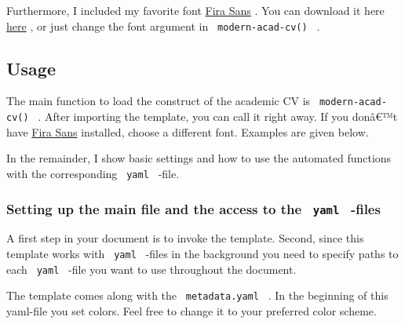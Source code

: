 Furthermore, I included my favorite font
\href{https://fonts.google.com/specimen/Fira+Sans}{Fira Sans} . You can
download it here
\href{https://fonts.google.com/specimen/Fira+Sans}{here} , or just
change the font argument in \texttt{\ modern-acad-cv()\ } .

\subsection{Usage}\label{usage}

The main function to load the construct of the academic CV is
\texttt{\ modern-acad-cv()\ } . After importing the template, you can
call it right away. If you donâ€™t have
\href{https://fonts.google.com/specimen/Fira+Sans}{Fira Sans} installed,
choose a different font. Examples are given below.

\begin{Shaded}
\begin{Highlighting}[]

\NormalTok{)    }

\end{Highlighting}
\end{Shaded}

In the remainder, I show basic settings and how to use the automated
functions with the corresponding \texttt{\ yaml\ } -file.

\subsubsection{\texorpdfstring{Setting up the main file and the access
to the \texttt{\ yaml\ }
-files}{Setting up the main file and the access to the  yaml  -files}}\label{setting-up-the-main-file-and-the-access-to-the-yaml--files}

A first step in your document is to invoke the template. Second, since
this template works with \texttt{\ yaml\ } -files in the background you
need to specify paths to each \texttt{\ yaml\ } -file you want to use
throughout the document.

The template comes along with the \texttt{\ metadata.yaml\ } . In the
beginning of this yaml-file you set colors. Feel free to change it to
your preferred color scheme.


